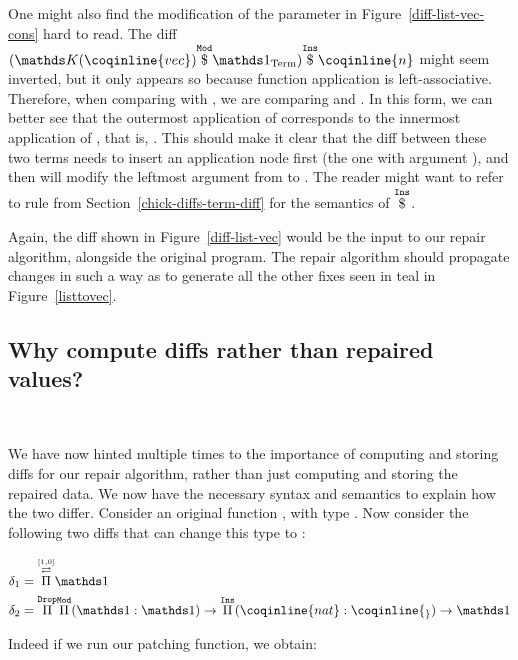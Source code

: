 One might also find the modification of the parameter in
Figure~\ref{diff-list-vec-cons} hard to read.  The diff $\MathInsApp
{(\MathModApp{\MathReplace{\coqinline{vec}}}{\MathSameTerm{}})} {\coqinline{n}}$
might seem inverted, but it only appears so because function application is
left-associative.  Therefore, when comparing  with
, we are comparing  and
.  In this form, we can better see that the
outermost application of  corresponds to the innermost
application of , that is, .  This should make it clear that the diff between these two terms needs to
insert an application node first (the one with argument ), and then
will modify the leftmost argument from  to .  The
reader might want to refer to rule  from
Section~\ref{chick-diffs-term-diff} for the semantics of $\overset{\mathtt{Ins}}{ \$ }$.

Again, the diff shown in Figure~\ref{diff-list-vec} would be the input to our
repair algorithm, alongside the original program.  The repair algorithm should
propagate changes in such a way as to generate all the other fixes seen in teal
in Figure~\ref{listtovec}.

\subsection{Why compute diffs rather than repaired
values?}~\label{chick-diffs-importance}

We have now hinted multiple times to the importance of computing and storing
diffs for our repair algorithm, rather than just computing and storing the
repaired data.  We now have the necessary syntax and semantics to explain how
the two differ.  Consider an original function , with type
.  Now consider the following two diffs that can
change this type to :

\begin{align*}
\delta_{1} & = \MathPermutePis{[1, 0]}{\MathSame{}}\\
\delta_{2} & =
  \MathDropPi{\MathModPi
             {\MathSame{}}
             {\MathSame{}}
             {\MathInsPi{\coqinline{_}}{\coqinline{nat}}{\MathSame{}}}
             }
\end{align*}

\noindent%
%
Indeed if we run our patching function, we obtain:

